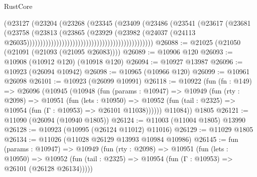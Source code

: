 \begin{lexlean}{RustCore}
\begin{coremodule}
                                                                  (@23127
                                                                    (@23204
                                                                      (@23268
                                                                        (@23345
                                                                          (@23409
                                                                            (@23486
                                                                              (@23541
                                                                                (@23617
                                                                                  (@23681
                                                                                    (@23758
                                                                                      (@23813
                                                                                        (@23865
                                                                                          (@23929
                                                                                            (@23982
                                                                                              (@24037
                                                                                                (@24113
                                                                                                  @26035)))))))))))))))))))))))))))))))))))))))))))))))
@26088 := @21025 (@21050 (@21091 (@21093 (@21095 @26083))))
@26089 := @10906 @120
@26093 := @10908 (@10912 @120) (@10918 @120)
@26094 := @10927 @13987
@26096 := @10923 (@26094 @10942)
@26098 := @10965 (@10966 @120)
@26099 := @10961 @26098
@26101 := @10923 (@26099 @10991)
@26118 := @10922
    (fun (fn : @149) =>
    @26096
      (@10945
        (@10948
          (fun (params : @10947) =>
          @10949
            (fun (rty : @2098) =>
            @10951
              (fun (lets : @10950) =>
              @10952 (fun (tail : @2325) => @10954 (fun (Γ : @10953) => @26101 @11038))))))
        @11084))
    @1805
@26121 := @11090 (@26094 (@10940 @1805))
@26124 := @11003 (@11004 @1805) @13990
@26128 := @10923 (@10995 (@26124 @11012) @11016)
@26129 := @11029 @1805
@26134 := @11026 (@11028 @26129 @13993 @10984 @10986)
@26145 := fun (params : @10947) =>
  @10949
    (fun (rty : @2098) =>
    @10951
      (fun (lets : @10950) =>
      @10952 (fun (tail : @2325) => @10954 (fun (Γ : @10953) => @26101 (@26128 @26134)))))

\end{coremodule}
\end{lexlean}
